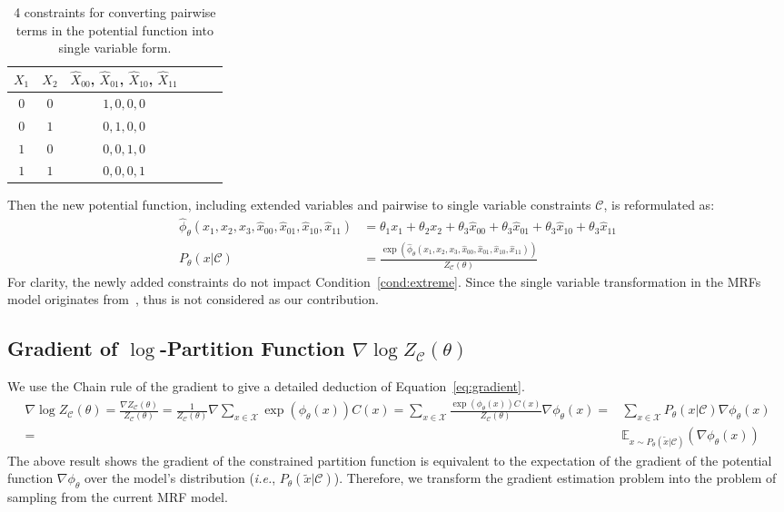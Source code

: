 \begin{table}[!ht]
    \centering
    \begin{tabular}{cc|cccc}
    \hline
        $X_1$ & $X_2$ &$\hat{X}_{00}$, $\hat{X}_{01}$, $\hat{X}_{10}$, $\hat{X}_{11}$  \\ \hline
        $0$ & $0$ & $1, 0, 0, 0$\\ 
        $0$ & $1$ & $0, 1, 0, 0$\\ 
        $1$ & $0$ & $0, 0, 1, 0$\\ 
        $1$ & $1$ & $0, 0, 0, 1$\\ 
    \hline
    \end{tabular}
    \caption{4 constraints for converting pairwise terms in the potential function into single variable form.}
    \label{tab:pairwise-to-single}
\end{table}
{Then the new potential function, including extended variables and pairwise to single variable constraints $\mathcal{C}$, is reformulated as:}
\begin{align*}
\hat{\phi}_{\theta}(x_1,x_2,x_3,\hat{x}_{00},\hat{x}_{01},\hat{x}_{10},\hat{x}_{11})&=\theta_1 x_1+\theta_2 x_2+\theta_3 \hat{x}_{00}+ \theta_3 \hat{x}_{01}+\theta_3 \hat{x}_{10}+\theta_3 \hat{x}_{11}\\
P_{\theta}(x|\mathcal{C})&=\frac{\exp(\hat{\phi}_{\theta}(x_1,x_2,x_3,\hat{x}_{00},\hat{x}_{01},\hat{x}_{10},\hat{x}_{11}))}{Z_{\mathcal{C}}(\theta)}
\end{align*}
For clarity, the newly added constraints do not impact Condition~\ref{cond:extreme}. Since the single variable transformation in the MRFs model originates from~\citet{Sang2005}, thus is not considered as our contribution.



\subsection{Gradient of $\log$-Partition Function $\nabla\log Z_\mathcal{C}(\theta)$}\label{appendix:partition}
We use the Chain rule of the gradient to give a detailed deduction of Equation~\eqref{eq:gradient}.
\begin{equation}\label{eq:full-gradient}
\begin{aligned}
\nabla\log Z_\mathcal{C}(\theta)=\frac{\nabla Z_\mathcal{C}(\theta)}{Z_\mathcal{C}(\theta)}=\frac{1}{Z_\mathcal{C}(\theta)}\nabla\sum_{x\in \mathcal{X}}\exp\left( \phi_{\theta}(x)\right)C(x)=\sum_{x\in\mathcal{X}} \frac{\exp(\phi_{\theta}(x))C(x) }{Z_\mathcal{C}(\theta)}{\nabla\phi_\theta(x)} =&\sum_{x\in \mathcal{X}} P_\theta(x|\mathcal{C}) \nabla\phi_{\theta}(x) \\
=&\mathbb{E}_{x\sim P_{\theta}(\tilde{x}|\mathcal{C})} \left({\nabla\phi_{\theta}(x)}\right)
\end{aligned}
\end{equation}
{The above result shows the gradient of the constrained partition function is equivalent to the expectation of the gradient of the potential function $\nabla\phi_{\theta}$ over the model's distribution (\textit{i.e.}, $P_{\theta}(\tilde{x}|\mathcal{C})$). Therefore, we transform the gradient estimation problem into the problem of sampling from the current MRF model.}


